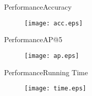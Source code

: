 \begin{frame}[c]{Performance}{Accuracy}
	\begin{figure}
		\texttt{[image: acc.eps]}
	\end{figure}
\end{frame}

\begin{frame}[c]{Performance}{AP@5}
	\begin{figure}
		\texttt{[image: ap.eps]}
	\end{figure}
\end{frame}

\begin{frame}[c]{Performance}{Running Time}
	\begin{figure}
		\texttt{[image: time.eps]}
	\end{figure}
\end{frame}

\addtocounter{framenumber}{-1}
\begin{frame}[c]{}
	\begin{center}
	\end{center}
\end{frame}

